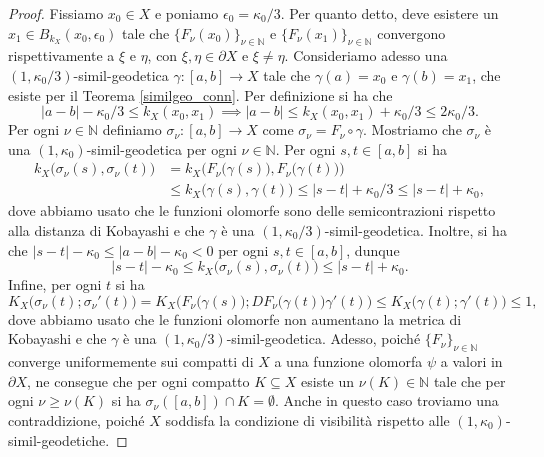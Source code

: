 \begin{proof}
    Fissiamo $x_0 \in X$ e poniamo $\epsilon_0=\kappa_0/3$. Per quanto detto, deve esistere un $x_1 \in B_{k_X}(x_0,\epsilon_0)$ tale che $\{F_\nu(x_0)\}_{\nu\in\mathbb{N}}$ e $\{F_\nu(x_1)\}_{\nu\in\mathbb{N}}$ convergono rispettivamente a $\xi$ e $\eta$, con $\xi,\eta \in \partial X$ e $\xi\not=\eta$. Consideriamo adesso una $(1,\kappa_0/3)$-simil-geodetica $\gamma:[a,b]\longrightarrow X$ tale che $\gamma(a)=x_0$ e $\gamma(b)=x_1$, che esiste per il Teorema \ref{similgeo_conn}. Per definizione si ha che
    $$|a-b|-\kappa_0/3 \le k_X(x_0,x_1) \implies |a-b| \le k_X(x_0,x_1)+\kappa_0/3 \le 2\kappa_0/3.$$
    Per ogni $\nu\in\mathbb{N}$ definiamo $\sigma_\nu:[a,b]\longrightarrow X$ come $\sigma_\nu=F_\nu\circ\gamma$. Mostriamo che $\sigma_\nu$ è una $(1,\kappa_0)$-simil-geodetica per ogni $\nu\in\mathbb{N}$. Per ogni $s,t \in [a,b]$ si ha
    \begin{align*}k_X\big(\sigma_\nu(s),\sigma_\nu(t)\big)&=k_X\Big(F_\nu\big(\gamma(s)\big),F_\nu\big(\gamma(t)\big)\Big)\\
        &\le k_X\big(\gamma(s),\gamma(t)\big) \le |s-t|+\kappa_0/3 \le |s-t|+\kappa_0,
    \end{align*}
    dove abbiamo usato che le funzioni olomorfe sono delle semicontrazioni rispetto alla distanza di Kobayashi e che $\gamma$ è una $(1,\kappa_0/3)$-simil-geodetica. Inoltre, si ha che $|s-t|-\kappa_0 \le |a-b|-\kappa_0 <0$ per ogni $s,t \in [a,b]$, dunque
    $$|s-t|-\kappa_0 \le k_X\big(\sigma_\nu(s),\sigma_\nu(t)\big) \le |s-t|+\kappa_0.$$
    Infine, per ogni $t$ si ha
    $$K_X\big(\sigma_\nu(t);\sigma_\nu'(t)\big)=K_X\Big(F_\nu\big(\gamma(s)\big);DF_\nu\big(\gamma(t)\big)\gamma'(t)\Big) \le K_X\big(\gamma(t);\gamma'(t)\big) \le 1,$$
    dove abbiamo usato che le funzioni olomorfe non aumentano la metrica di Kobayashi e che $\gamma$ è una $(1,\kappa_0/3)$-simil-geodetica. Adesso, poiché $\{F_\nu\}_{\nu\in\mathbb{N}}$ converge uniformemente sui compatti di $X$ a una funzione olomorfa $\psi$ a valori in $\partial X$, ne consegue che per ogni compatto $K\subseteq X$ esiste un $\nu(K)\in\mathbb{N}$ tale che per ogni $\nu\ge\nu(K)$ si ha $\sigma_\nu([a,b])\cap K=\emptyset$. Anche in questo caso troviamo una contraddizione, poiché $X$ soddisfa la condizione di visibilità rispetto alle $(1,\kappa_0)$-simil-geodetiche.
\end{proof}